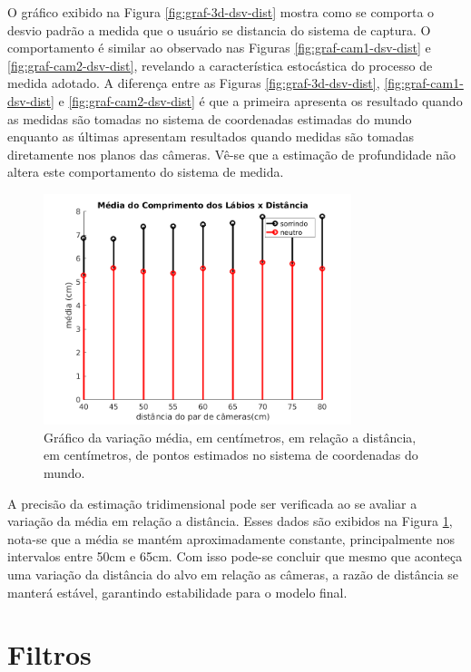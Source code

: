 O gráfico exibido na Figura \ref{fig:graf-3d-dsv-dist} mostra como se comporta o desvio padrão a medida que o usuário se distancia do sistema de captura. O comportamento é similar ao observado nas Figuras \ref{fig:graf-cam1-dsv-dist} e \ref{fig:graf-cam2-dsv-dist}, revelando a característica estocástica do processo de medida adotado. A diferença entre as Figuras  \ref{fig:graf-3d-dsv-dist}, \ref{fig:graf-cam1-dsv-dist} e \ref{fig:graf-cam2-dsv-dist} é que a primeira apresenta os resultado quando as medidas são tomadas no sistema de coordenadas estimadas do mundo enquanto as últimas apresentam resultados quando medidas são tomadas diretamente nos planos das câmeras. Vê-se que a estimação de profundidade não altera este comportamento do sistema de medida.

\begin{figure}[!htpb]
\centering
\includegraphics[width=0.8\textwidth]{figs/media3d.png} 
\caption{Gráfico da variação média, em centímetros, em relação a distância, em centímetros, de pontos estimados no sistema de coordenadas do mundo.}
\label{fig:graf-3d-media-dist}
\end{figure}

A precisão da estimação tridimensional pode ser verificada ao se avaliar a variação da média em relação a distância. Esses dados são exibidos na Figura \ref{fig:graf-3d-media-dist}, nota-se que a média se mantém aproximadamente constante, principalmente nos intervalos entre 50cm e 65cm. Com isso pode-se concluir que mesmo que aconteça uma variação da distância do alvo em relação as câmeras, a razão de distância se manterá estável, garantindo estabilidade para o modelo final.

\section{Filtros}

